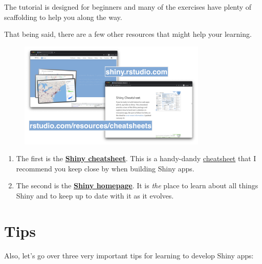\documentclass[
  letterpaper,
  DIV=11,
  numbers=noendperiod]{scrreprt}
\begin{document}
The tutorial is designed for beginners and many of the exercises have
plenty of scaffolding to help you along the way.

That being said, there are a few other resources that might help your
learning.

\begin{figure}

{\centering \includegraphics[width=0.8\textwidth,height=\textheight]{./images/help.png}

}

\end{figure}

\begin{enumerate}
\def\labelenumi{\arabic{enumi}.}
\item
  The first is the
  \href{https://github.com/rstudio/cheatsheets/raw/master/shiny.pdf}{\textbf{Shiny
  cheatsheet}}. This is a handy-dandy
  \href{https://rstudio.com/resources/cheatsheets/}{cheatsheet} that I
  recommend you keep close by when building Shiny apps.
\item
  The second is the \href{https://shiny.rstudio.com}{\textbf{Shiny
  homepage}}. It is \emph{the} place to learn about all things Shiny and
  to keep up to date with it as it evolves.
\end{enumerate}

\hypertarget{tips}{%
\section{Tips}\label{tips}}

Also, let's go over three very important tips for learning to develop
Shiny apps:
\end{document}
